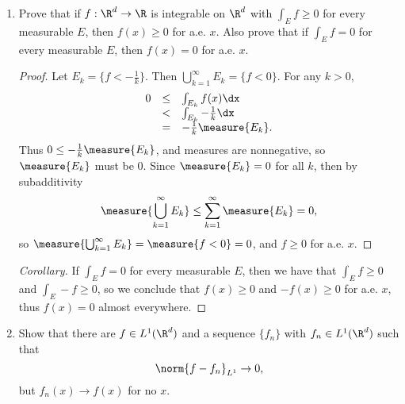 \documentclass[letterpaper]{article}
\begin{document}
\begin{enumerate}
\begin{enumerate}
\begin{proof}
$$\begin{array}{rcl}
        E_{2^k}&=&B_{2^{-\frac{k}{b}}}\cap B_1^\complement \\
        &\subset& B_{2^{-\frac{k}{b}}},
      \end{array}$$
      and we can calculate as in Part (i):
      $$\begin{array}{rcl}
        \ds\sum_{k=-\infty}^\infty 2^k\measure{E_{2^k}} &=& \ds\sum_{k=-\infty}^{-1} 2^k\measure{E_{2^k}} \\
        &<& \ds\sum_{k=-\infty}^{-1} 2^k\measure{B_{2^{-\frac{k}{b}}}} \\
        &=& \ds\sum_{k=-\infty}^{-1} (V_d)(2^{1-\frac{d}{b}})^k \\
      \end{array}$$
      which converges iff $b>d$. \footnote{If this is not obvious, note that $k$ is negative, so the sum converges iff $2^{1-\frac{d}{b}}>1$ iff $1-\frac{d}{b}>0$ iff $1>\frac{d}{b}$ iff $b>d$.}
    \end{proof}
  \end{enumerate}

  \item Prove that if $f:\R^d\to\R$ is integrable on $\R^d$ with $\int_E f \geq 0$ for every measurable $E$, then $f(x) \geq 0$ for a.e. $x$. Also prove that if $\int_E f = 0$ for every measurable $E$, then $f(x) = 0$ for a.e. $x$.
  \begin{proof}
    Let $E_k = \{f<-\frac{1}{k}\}$. Then $\bigcup_{k=1}^\infty E_k = \{f < 0\}$. For any $k >0$,
    $$\begin{array}{rcl}
      0 &\leq& \int_{E_k} f(x)\dx \\
      &<& \int_{E_k} -\frac{1}{k}\dx \\
      &=& -\frac{1}{k}\measure{E_k}.
    \end{array}$$
    Thus $0\leq-\frac{1}{k}\measure{E_k}$, and measures are nonnegative, so $\measure{E_k}$ must be 0. Since $\measure{E_k}=0$ for all $k$, then by subadditivity
    $$\measure{\bigcup_{k=1}^\infty E_k}\leq\sum_{k=1}^\infty \measure{E_k}=0,$$
    so $\measure{\bigcup_{k=1}^\infty E_k}=\measure{f<0}=0$, and $f\geq0$ for a.e. $x$.
  \end{proof}
  \begin{proof}[Corollary]
    If $\int_E f = 0$ for every measurable $E$, then we have that $\int_E f \geq 0$ and $\int_E -f \geq 0$, so we conclude that $f(x) \geq 0$ and $-f(x) \geq 0$ for a.e. $x$, thus $f(x)=0$ almost everywhere.
  \end{proof}

\item Show that there are $f\in L^1(\R^d)$ and a sequence $\{f_n\}$ with $f_n\in L^1(\R^d)$ such that
$$\norm{f-f_n}_{L^1}\to0,$$
but $f_n(x)\to f(x)$ for no $x$.


\end{enumerate}
\end{document}

